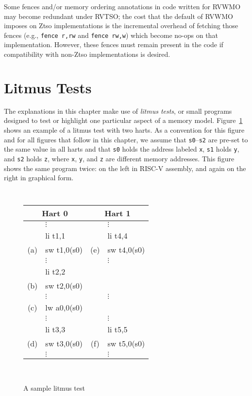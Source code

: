 Some fences and/or memory ordering annotations in code written for RVWMO may become redundant under RVTSO; the cost that the default of RVWMO imposes on Ztso implementations is the incremental overhead of fetching those fences (e.g., {\tt fence~r,rw} and {\tt fence rw,w}) which become no-ops on that implementation.
However, these fences must remain present in the code if compatibility with non-Ztso implementations is desired.

\section{Litmus Tests}
The explanations in this chapter make use of {\em litmus tests}, or small programs designed to test or highlight one particular aspect of a memory model.
Figure~\ref{fig:litmus:sample} shows an example of a litmus test with two harts.
As a convention for this figure and for all figures that follow in this chapter, we assume that {\tt s0}--{\tt s2} are pre-set to the same value in all harts and that {\tt s0} holds the address labeled {\tt x}, {\tt s1} holds {\tt y}, and {\tt s2} holds {\tt z}, where {\tt x}, {\tt y}, and {\tt z} are different memory addresses.
This figure shows the same program twice: on the left in RISC-V assembly, and again on the right in graphical form.

\begin{figure}[h!]
  \centering
  {
    \tt\small
    \begin{tabular}{cl||cl}
    \multicolumn{2}{c}{Hart 0} & \multicolumn{2}{c}{Hart 1} \\
    \hline
          & $\vdots$    &     & $\vdots$    \\
          & li t1,1     &     & li t4,4     \\
      (a) & sw t1,0(s0) & (e) & sw t4,0(s0) \\
          & $\vdots$    &     & $\vdots$    \\
          & li t2,2     &     &             \\
      (b) & sw t2,0(s0) &     &             \\
          & $\vdots$    &     & $\vdots$    \\
      (c) & lw a0,0(s0) &     &             \\
          & $\vdots$    &     & $\vdots$    \\
          & li t3,3     &     & li t5,5     \\
      (d) & sw t3,0(s0) & (f) & sw t5,0(s0) \\
          & $\vdots$    &     & $\vdots$    \\
    \end{tabular}
  }
  ~~~~
  \diagram
  \caption{A sample litmus test}
  \label{fig:litmus:sample}
\end{figure}

